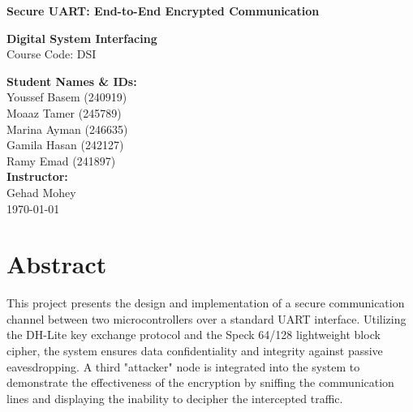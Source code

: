 \documentclass[12pt,a4paper]{article}
\begin{document}
\begin{titlepage}
    \centering
    \vspace*{1cm}
    
    {\Huge \textbf{Secure UART: End-to-End Encrypted Communication}} \\
    \vspace{1.5cm}
    
    {\Large \textbf{Digital System Interfacing}} \\
    {\large Course Code: DSI} \\
    \vspace{1.5cm}
    
    \textbf{Student Names \& IDs:} \\[0.5cm]
    Youssef Basem (240919) \\
    Moaaz Tamer (245789) \\
    Marina Ayman (246635) \\
    Gamila Hasan (242127) \\
    Ramy Emad (241897) \\
    
    \vspace{2cm}
    \textbf{Instructor:} \\
    Gehad Mohey \\
    
    \vfill
    \today
\end{titlepage}

\section*{Abstract}
This project presents the design and implementation of a secure communication channel between two microcontrollers over a standard UART interface. Utilizing the DH-Lite key exchange protocol and the Speck 64/128 lightweight block cipher, the system ensures data confidentiality and integrity against passive eavesdropping. A third "attacker" node is integrated into the system to demonstrate the effectiveness of the encryption by sniffing the communication lines and displaying the inability to decipher the intercepted traffic.

\newpage

\tableofcontents
\newpage
\end{document}
